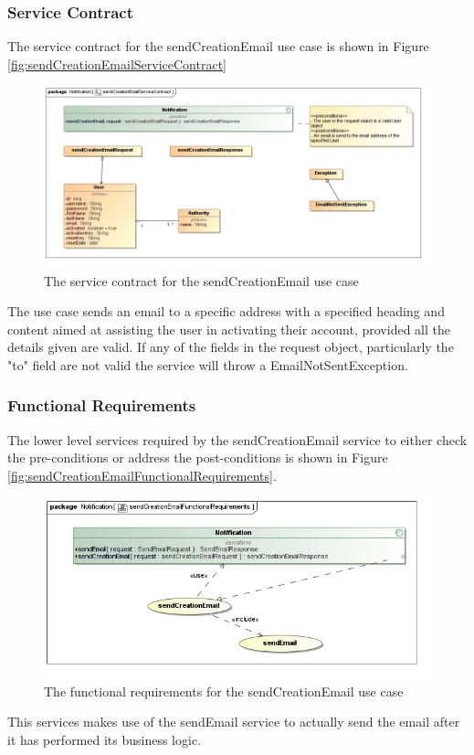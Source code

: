 \subsubsection{Service Contract}
The service contract for the sendCreationEmail use case is shown in Figure \ref{fig:sendCreationEmailServiceContract}
\begin{figure}[H]
	\begin{center}
		\includegraphics[scale=0.5]{../Diagrams and Charts/Notifications/sendCreationEmailServiceContract.jpg}
		\caption{The service contract for the sendCreationEmail use case}
		\label{sendCreationEmailServiceContract}
	\end{center}
\end{figure}
	
The use case sends an email to a specific address with a specified heading and content
aimed at assisting the user in activating their account, provided all the details
given are valid. If any of the fields in the request object, particularly the "to" field
are not valid the service will throw a EmailNotSentException.

\subsubsection{Functional Requirements}
The lower level services required by the sendCreationEmail service to either check the
pre-conditions or address the post-conditions is shown in Figure
\ref{fig:sendCreationEmailFunctionalRequirements}.
\begin{figure}[H]
	\begin{center}
		\includegraphics[scale=0.7]{../Diagrams and Charts/Notifications/sendCreationEmailFunctionalRequirements.jpg}
		\caption{The functional requirements for the sendCreationEmail use case}
	\end{center}
	\label{sendCreationEmailFunctionalRequirements}
\end{figure}

This services makes use of the sendEmail service to actually send the email after
it has performed its business logic.

